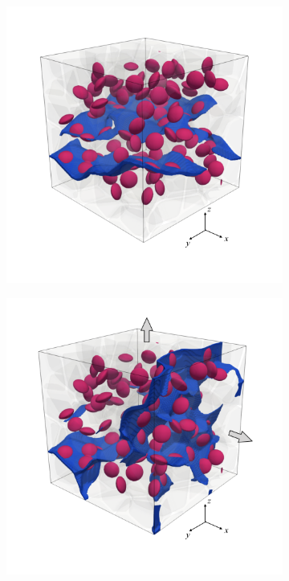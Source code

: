 \begin{figure}[!htbp]
  \centering
  \begin{subfigure}{0.32\textwidth}
    \centering
    \includegraphics[width=\textwidth]{Chapter3/figures/b100_end}
    \caption{}
    \label{b100_load1}
  \end{subfigure}
  \begin{subfigure}{0.32\textwidth}
    \centering
    \includegraphics[width=\textwidth]{Chapter3/figures/b100_end_yz}

\end{subfigure}
\end{figure}
